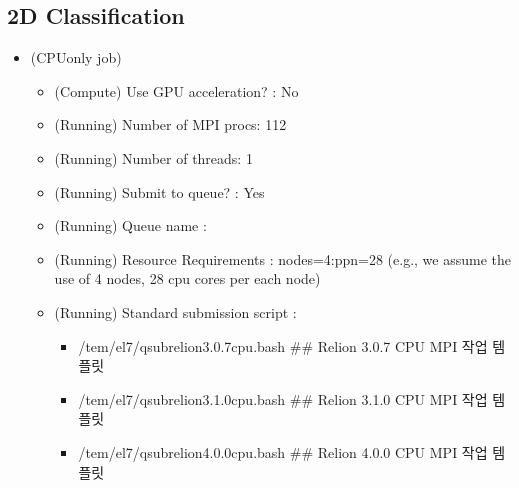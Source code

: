 \documentclass[a4paper,10pt,english]{sphinxmanual}
\begin{document}



\subsection{2D Classification}
\label{\detokenize{relion:d-classification}}\begin{itemize}
\item {} 
\sphinxAtStartPar
{} (CPU\sphinxhyphen{}only job)
\begin{itemize}
\item {} 
\sphinxAtStartPar
(Compute) Use GPU acceleration? : No

\item {} 
\sphinxAtStartPar
(Running) Number of MPI procs: 112

\item {} 
\sphinxAtStartPar
(Running) Number of threads: 1

\item {} 
\sphinxAtStartPar
(Running) Submit to queue? : Yes

\item {} 
\sphinxAtStartPar
(Running) Queue name : 

\item {} 
\sphinxAtStartPar
(Running) Resource Requirements : nodes=4:ppn=28  (e.g., we assume the use of 4 nodes, 28 cpu cores per each node)

\item {} 
\sphinxAtStartPar
(Running) Standard submission script :
\begin{itemize}
\item {} 
\sphinxAtStartPar
/tem/el7/qsub\sphinxhyphen{}relion\sphinxhyphen{}3.0.7\sphinxhyphen{}cpu.bash           \#\# Relion 3.0.7 CPU MPI 작업 템플릿

\item {} 
\sphinxAtStartPar
/tem/el7/qsub\sphinxhyphen{}relion\sphinxhyphen{}3.1.0\sphinxhyphen{}cpu.bash           \#\# Relion 3.1.0 CPU MPI 작업 템플릿

\item {} 
\sphinxAtStartPar
/tem/el7/qsub\sphinxhyphen{}relion\sphinxhyphen{}4.0.0\sphinxhyphen{}cpu.bash           \#\# Relion 4.0.0 CPU MPI 작업 템플릿

\end{itemize}

\end{itemize}

\end{itemize}
\end{document}
